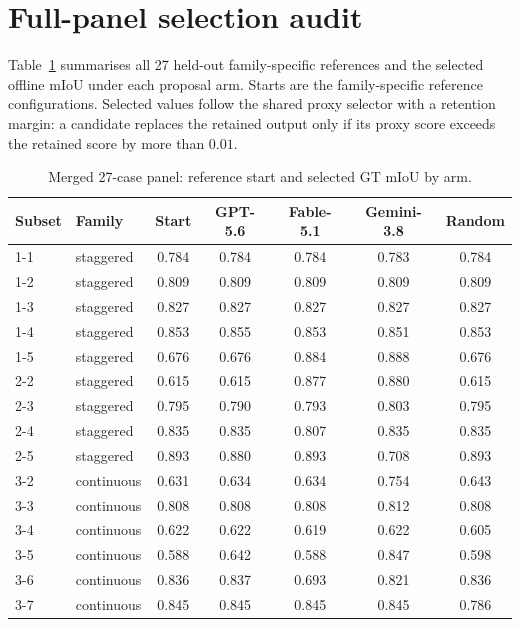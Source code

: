\documentclass[a4paper,fleqn]{cas-dc}
\begin{document}
\section{Full-panel selection audit}\label{app:poc-selection}

Table~\ref{tab:panel-audit} summarises all 27 held-out family-specific references and the selected offline mIoU under each proposal arm. Starts are the family-specific reference configurations. Selected values follow the shared proxy selector with a retention margin: a candidate replaces the retained output only if its proxy score exceeds the retained score by more than $0.01$.

\begin{table}[t]
\caption{Merged 27-case panel: reference start and selected GT mIoU by arm.}\label{tab:panel-audit}
{\footnotesize
\begin{tabular*}{\textwidth}{@{\extracolsep{\fill}} l l c cccc @{}}
\toprule
Subset & Family & Start & GPT-5.6 & Fable-5.1 & Gemini-3.8 & Random \\
\midrule
1-1 & staggered & 0.784 & 0.784 & 0.784 & 0.783 & 0.784 \\
1-2 & staggered & 0.809 & 0.809 & 0.809 & 0.809 & 0.809 \\
1-3 & staggered & 0.827 & 0.827 & 0.827 & 0.827 & 0.827 \\
\rowcolor{yellow!25}1-4 & staggered & 0.853 & 0.855 & 0.853 & 0.851 & 0.853 \\
1-5 & staggered & 0.676 & 0.676 & 0.884 & 0.888 & 0.676 \\
2-2 & staggered & 0.615 & 0.615 & 0.877 & 0.880 & 0.615 \\
\rowcolor{yellow!25}2-3 & staggered & 0.795 & 0.790 & 0.793 & 0.803 & 0.795 \\
2-4 & staggered & 0.835 & 0.835 & 0.807 & 0.835 & 0.835 \\
2-5 & staggered & 0.893 & 0.880 & 0.893 & 0.708 & 0.893 \\
3-2 & continuous & 0.631 & 0.634 & 0.634 & 0.754 & 0.643 \\
\rowcolor{yellow!25}3-3 & continuous & 0.808 & 0.808 & 0.808 & 0.812 & 0.808 \\
3-4 & continuous & 0.622 & 0.622 & 0.619 & 0.622 & 0.605 \\
3-5 & continuous & 0.588 & 0.642 & 0.588 & 0.847 & 0.598 \\
3-6 & continuous & 0.836 & 0.837 & 0.693 & 0.821 & 0.836 \\
3-7 & continuous & 0.845 & 0.845 & 0.845 & 0.845 & 0.786 \\

\end{tabular*}}
\end{table}
\end{document}
